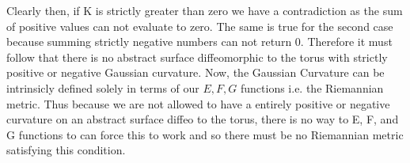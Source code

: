 \documentclass[a4paper, 11pt]{article}
\begin{document}
	\noindent Clearly then, if K is strictly greater than zero we have a contradiction as the sum of positive values can not evaluate to zero. The same is true for the second case because summing strictly negative numbers can not return 0. Therefore it must follow that there is no abstract surface diffeomorphic to the torus with strictly positive or negative Gaussian curvature. Now, the Gaussian Curvature can be intrinsicly defined solely in terms of our $E, F, G$ functions i.e. the Riemannian metric. Thus because we are not allowed to have a entirely positive or negative curvature on an abstract surface diffeo to the torus, there is no way to E, F, and G functions to can force this to work and so there must be no Riemannian metric satisfying this condition. 




		
		
\end{document}
